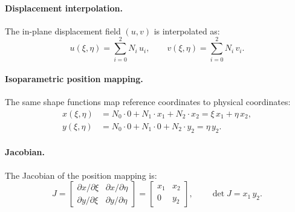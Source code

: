 \paragraph{Displacement interpolation.}
The in-plane displacement field $(u, v)$ is interpolated as:
\begin{equation}
  u(\xi,\eta) = \sum_{i=0}^{2} N_i\, u_i, \qquad
  v(\xi,\eta) = \sum_{i=0}^{2} N_i\, v_i.
\end{equation}

\paragraph{Isoparametric position mapping.}
The same shape functions map reference coordinates to physical coordinates:
\begin{align}
  x(\xi,\eta) &= N_0 \cdot 0 + N_1 \cdot x_1 + N_2 \cdot x_2 = \xi\, x_1 + \eta\, x_2, \\
  y(\xi,\eta) &= N_0 \cdot 0 + N_1 \cdot 0 + N_2 \cdot y_2 = \eta\, y_2.
\end{align}

\paragraph{Jacobian.}
The Jacobian of the position mapping is:
\begin{equation}
  J = \begin{bmatrix}
    \partial x / \partial \xi & \partial x / \partial \eta \\
    \partial y / \partial \xi & \partial y / \partial \eta
  \end{bmatrix}
  = \begin{bmatrix}
    x_1 & x_2 \\
    0   & y_2
  \end{bmatrix}, \qquad
  \det J = x_1\, y_2.
\end{equation}

